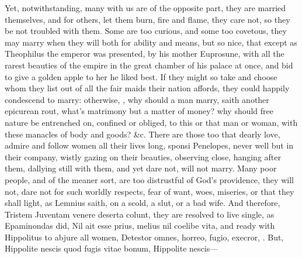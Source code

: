 {Yet, notwithstanding, many with us are of the opposite part, they are
married themselves, and for others, let them burn, fire and flame, they
care not, so they be not troubled with them. Some are too curious, and
some too covetous, they may marry when they will both for ability and
means, but so nice, that except as Theophilus the emperor was
presented, by his mother Euprosune, with all the rarest beauties of the
empire in the great chamber of his palace at once, and bid to give a
golden apple to her he liked best. If they might so take and choose
whom they list out of all the fair maids their nation affords, they
could happily condescend to marry: otherwise, \etc{}, why should a man
marry, saith another epicurean rout, what's matrimony but a matter of
money? why should free nature be entrenched on, confined or obliged, to
this or that man or woman, with these manacles of body and goods? \&c.
There are those too that dearly love, admire and follow women all their
lives long, sponsi Penelopes, never well but in their company, wistly
gazing on their beauties, observing close, hanging after them, dallying
still with them, and yet dare not, will not marry. Many poor people,
and of the meaner sort, are too distrustful of God's providence, they
will not, dare not for such worldly respects, fear of want, woes,
miseries, or that they shall light, as Lemnius saith, on a scold,
a slut, or a bad wife. And therefore, Tristem Juventam venere
deserta colunt, they are resolved to live single, as Epaminondas
did, Nil ait esse prius, melius nil coelibe vita, and ready with
Hippolitus to abjure all women, Detestor omnes, horreo, fugio,
execror, \etc{}. But,
Hippolite nescis quod fugis vitae bonum,
Hippolite nescis---

}
